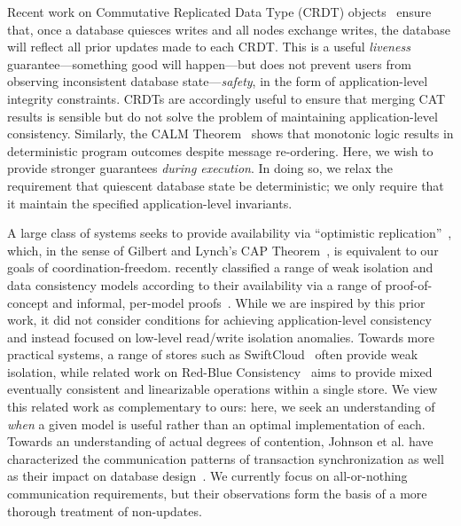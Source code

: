  Recent work on Commutative
Replicated Data Type (CRDT) objects~\cite{crdt} ensure that, once a
database quiesces writes and all nodes exchange writes, the database
will reflect all prior updates made to each CRDT. This is a useful
\textit{liveness} guarantee---something good will happen---but does
not prevent users from observing inconsistent database
state---\textit{safety}, in the form of application-level integrity
constraints. CRDTs are accordingly useful to ensure that merging CAT
results is sensible but do not solve the problem of maintaining
application-level consistency. Similarly, the CALM
Theorem~\cite{ameloot-calm,calm} shows that monotonic logic results in
deterministic program outcomes despite message re-ordering. Here, we
wish to provide stronger guarantees \textit{during execution}. In
doing so, we relax the requirement that quiescent database state be
deterministic; we only require that it maintain the specified
application-level invariants.

 A large class of systems
seeks to provide availability via ``optimistic
replication''~\cite{optimistic}, which, in the sense of Gilbert and
Lynch's CAP Theorem~\cite{gilbert-cap}, is equivalent to our goals of
coordination-freedom. \cite{hat-vldb} recently classified a range of
weak isolation and data consistency models according to their
availability via a range of proof-of-concept and informal, per-model
proofs~\cite{hat-vldb}. While we are inspired by this prior work, it
did not consider conditions for achieving application-level
consistency and instead focused on low-level read/write isolation
anomalies. Towards more practical systems, a range of stores such as
SwiftCloud~\cite{swift} often provide weak isolation, while related
work on Red-Blue Consistency~\cite{redblue} aims to provide mixed
eventually consistent and linearizable operations within a single
store. We view this related work as complementary to ours: here, we
seek an understanding of \textit{when} a given model is useful rather
than an optimal implementation of each. Towards an understanding of
actual degrees of contention, Johnson et al. have characterized the
communication patterns of transaction synchronization as well as their
impact on database design~\cite{shore-communication}. We currently
focus on all-or-nothing communication requirements, but their
observations form the basis of a more thorough treatment of
non-\iconfluent updates.

